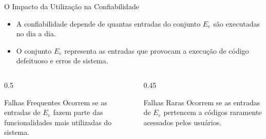 \documentclass[9pt]{beamer}
\begin{document}
\begin{frame}{O Impacto da Utilização na Confiabilidade}
    \begin{itemize}
        \item A confiabilidade depende de quantas entradas do conjunto $E_e$ são executadas no dia a dia.
        \item O conjunto $E_e$ representa as entradas que provocam a execução de código defeituoso e erros de sistema.
    \end{itemize}

    \begin{columns}[T]
        \begin{column}{0.5\textwidth}
            \begin{block}{Falhas Frequentes}
                Ocorrem se as entradas de $E_e$ fazem parte das funcionalidades mais utilizadas do sistema.
            \end{block}
        \end{column}
        \begin{column}{0.45\textwidth}
            \begin{block}{Falhas Raras}
                Ocorrem se as entradas de $E_e$ pertencem a códigos raramente acessados pelos usuários.
            \end{block}
        \end{column}
    \end{columns}
\end{frame}
\end{document}
